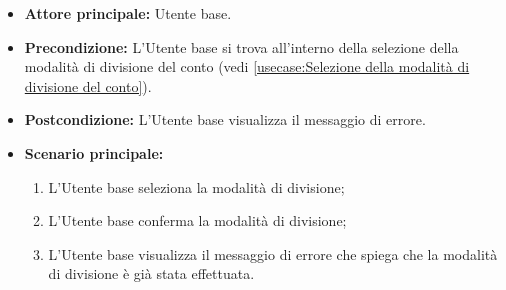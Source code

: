 \label{usecase:Visualizzazione errore divisione del conto già effettuata}
\begin{itemize}
	\item \textbf{Attore principale:} Utente base.

	\item \textbf{Precondizione:}
	      L'Utente base si trova all'interno della selezione della modalità di divisione del conto (vedi \autoref{usecase:Selezione della modalità di divisione del conto}).

	\item \textbf{Postcondizione:}
	      L'Utente base visualizza il messaggio di errore.

	\item \textbf{Scenario principale:}
	      \begin{enumerate}
		      \item L'Utente base seleziona la modalità di divisione;

		      \item L'Utente base conferma la modalità di divisione;

		      \item L'Utente base visualizza il messaggio di errore che spiega che
		            la modalità di divisione è già stata effettuata.
	      \end{enumerate}
\end{itemize}
